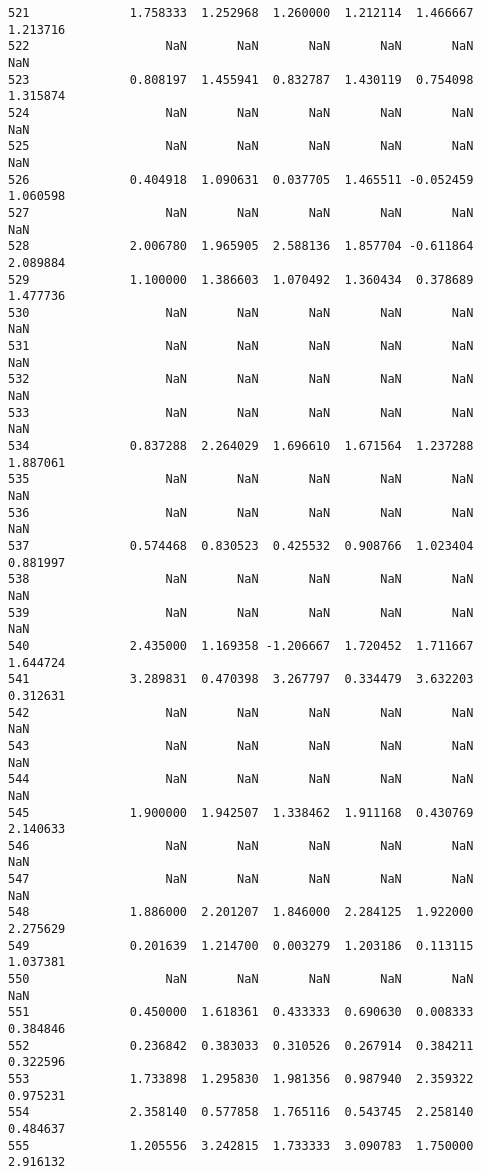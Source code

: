 \documentclass[11pt]{article}
\begin{document}
\begin{Verbatim}[commandchars=\\\{\}]
521              1.758333  1.252968  1.260000  1.212114  1.466667  1.213716
522                   NaN       NaN       NaN       NaN       NaN       NaN
523              0.808197  1.455941  0.832787  1.430119  0.754098  1.315874
524                   NaN       NaN       NaN       NaN       NaN       NaN
525                   NaN       NaN       NaN       NaN       NaN       NaN
526              0.404918  1.090631  0.037705  1.465511 -0.052459  1.060598
527                   NaN       NaN       NaN       NaN       NaN       NaN
528              2.006780  1.965905  2.588136  1.857704 -0.611864  2.089884
529              1.100000  1.386603  1.070492  1.360434  0.378689  1.477736
530                   NaN       NaN       NaN       NaN       NaN       NaN
531                   NaN       NaN       NaN       NaN       NaN       NaN
532                   NaN       NaN       NaN       NaN       NaN       NaN
533                   NaN       NaN       NaN       NaN       NaN       NaN
534              0.837288  2.264029  1.696610  1.671564  1.237288  1.887061
535                   NaN       NaN       NaN       NaN       NaN       NaN
536                   NaN       NaN       NaN       NaN       NaN       NaN
537              0.574468  0.830523  0.425532  0.908766  1.023404  0.881997
538                   NaN       NaN       NaN       NaN       NaN       NaN
539                   NaN       NaN       NaN       NaN       NaN       NaN
540              2.435000  1.169358 -1.206667  1.720452  1.711667  1.644724
541              3.289831  0.470398  3.267797  0.334479  3.632203  0.312631
542                   NaN       NaN       NaN       NaN       NaN       NaN
543                   NaN       NaN       NaN       NaN       NaN       NaN
544                   NaN       NaN       NaN       NaN       NaN       NaN
545              1.900000  1.942507  1.338462  1.911168  0.430769  2.140633
546                   NaN       NaN       NaN       NaN       NaN       NaN
547                   NaN       NaN       NaN       NaN       NaN       NaN
548              1.886000  2.201207  1.846000  2.284125  1.922000  2.275629
549              0.201639  1.214700  0.003279  1.203186  0.113115  1.037381
550                   NaN       NaN       NaN       NaN       NaN       NaN
551              0.450000  1.618361  0.433333  0.690630  0.008333  0.384846
552              0.236842  0.383033  0.310526  0.267914  0.384211  0.322596
553              1.733898  1.295830  1.981356  0.987940  2.359322  0.975231
554              2.358140  0.577858  1.765116  0.543745  2.258140  0.484637
555              1.205556  3.242815  1.733333  3.090783  1.750000  2.916132

\end{Verbatim}
\end{document}
